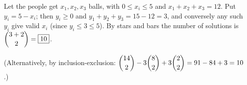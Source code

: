 Let the people get $x_1,x_2,x_3$ balls, with $0\le x_i\le5$ and $x_1+x_2+x_3=12$. Put $y_i=5-x_i$; then $y_i\ge0$ and $y_1+y_2+y_3=15-12=3$, and conversely any such $y_i$ give valid $x_i$ (since $y_i\le3\le5$). By stars and bars the number of solutions is $\dbinom{3+2}{2}=\boxed{10}$.

(Alternatively, by inclusion-exclusion: $\dbinom{14}{2}-3\dbinom{8}{2}+3\dbinom{2}{2}=91-84+3=10$.)
